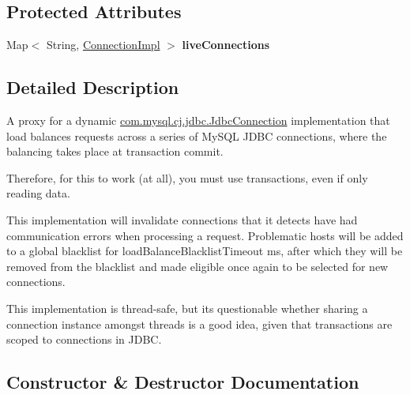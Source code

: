\subsection*{Protected Attributes}
\begin{DoxyCompactItemize}
\item 
\mbox{\label{classcom_1_1mysql_1_1cj_1_1jdbc_1_1ha_1_1_load_balanced_connection_proxy_a675cf5baac8ce2e4d6ba049def5a373e}} 
Map$<$ String, \mbox{\hyperlink{classcom_1_1mysql_1_1cj_1_1jdbc_1_1_connection_impl}{Connection\+Impl}} $>$ {\bfseries live\+Connections}
\end{DoxyCompactItemize}


\subsection{Detailed Description}
A proxy for a dynamic \mbox{\hyperlink{interfacecom_1_1mysql_1_1cj_1_1jdbc_1_1_jdbc_connection}{com.\+mysql.\+cj.\+jdbc.\+Jdbc\+Connection}} implementation that load balances requests across a series of My\+S\+QL J\+D\+BC connections, where the balancing takes place at transaction commit.

Therefore, for this to work (at all), you must use transactions, even if only reading data.

This implementation will invalidate connections that it detects have had communication errors when processing a request. Problematic hosts will be added to a global blacklist for load\+Balance\+Blacklist\+Timeout ms, after which they will be removed from the blacklist and made eligible once again to be selected for new connections.

This implementation is thread-\/safe, but it\textquotesingle{}s questionable whether sharing a connection instance amongst threads is a good idea, given that transactions are scoped to connections in J\+D\+BC. 

\subsection{Constructor \& Destructor Documentation}
\mbox{\label{classcom_1_1mysql_1_1cj_1_1jdbc_1_1ha_1_1_load_balanced_connection_proxy_a236928d6a49c1bbc3dfd6e4615a34f0d}} 

